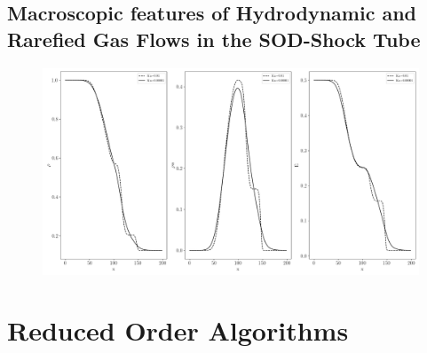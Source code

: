 \documentclass[12pt, a4paper]{article}
\begin{document}
\subsection{Macroscopic features of Hydrodynamic and Rarefied Gas Flows in the SOD-Shock Tube} \label{FeaturesSOD}
\begin{figure}[!htbp]
	\includegraphics[width=\textwidth]{Figures/Macroscopic_Quantities_Original.png}
\end{figure}
\section{Reduced Order Algorithms}
\end{document}
